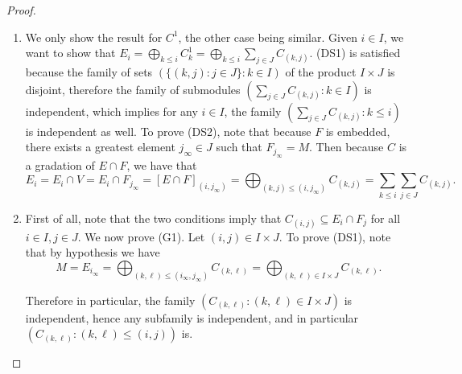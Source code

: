 \documentclass[oneside,11pt]{amsart}
\theoremstyle{definition}
\newtheorem{proof techniques}{Proof Techniques}
\begin{document}
\begin{proof}
\
\begin{enumerate}

\item We only show the result for $C^1$, the other case being similar. Given $i \in I$, we want to show that $E_i = \bigoplus_{k \leq i} C^1_k = \bigoplus_{k \leq i} \sum_{j \in J} C_{(k , j)}$. (DS1) is satisfied because the family of sets $( \{ (k , j ) : j \in J \} : k \in I )$ of the product $I \times J$ is disjoint, therefore the family of submodules $( \sum_{j \in J} C_{(k , j)} : k \in I)$ is independent, which implies for any $i \in I$, the family $( \sum_{j \in J} C_{(k , j)} : k \leq i)$ is independent as well. To prove (DS2), note that because $F$ is embedded, there exists a greatest element $j_\infty \in J$ such that $F_{j_\infty} = M$. Then because $C$ is a gradation of $E \cap F$, we have that 
\begin{equation*}
E_i = E_i \cap V = E_i \cap F_{j_\infty} = [E \cap F]_{(i , j_\infty)} = \bigoplus_{(k , j) \leq (i , j_\infty)} C_{(k , j)}  = \sum_{k \leq i} \sum_{j \in J} C_{(k , j)}. 
\end{equation*}

\item First of all, note that the two conditions imply that $C_{(i , j)} \subseteq E_i \cap F_j$ for all $i \in I , j \in J$. We now prove (G1). Let $(i , j) \in I \times J$. To prove (DS1), note that by hypothesis we have
\begin{equation*}
M = E_{i_\infty} = \bigoplus_{(k , \ell) \leq (i_\infty , j_\infty)} C_{(k , \ell)} = \bigoplus_{(k , \ell) \in I \times J} C_{(k , \ell)}.
\end{equation*}

Therefore in particular, the family $(C_{(k , \ell)} : (k , \ell) \in I \times J )$ is independent, hence any subfamily is independent, and in particular $(C_{(k , \ell)} : (k , \ell) \leq (i , j) )$ is. 


\end{enumerate}
\end{proof}
\end{document}
